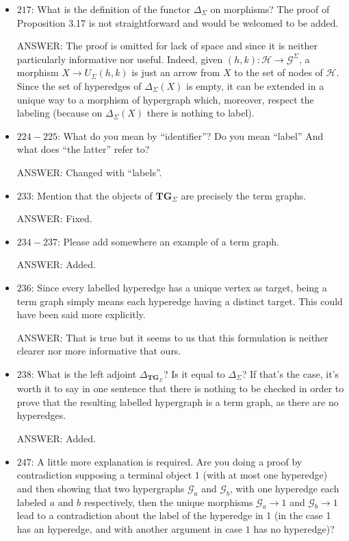 \documentclass[english,11pt,a4paper]{article}
\begin{document}
\begin{itemize}
\item $217$: What is the definition of the functor $\Delta_\Sigma$ on morphisms? The proof of Proposition 3.17 is not straightforward and would be welcomed to be added.

ANSWER: The proof is omitted for lack of space and since it is neither particularly informative nor useful. Indeed, given $(h,k)\colon \mathcal{H}\to \mathcal{G}^\Sigma$,  a morphism $X\to U_{\Sigma}(h,k)$ is just an arrow from $X$ to the set of nodes of $\mathcal{H}$. Since the set of hyperedges of $\Delta_{\Sigma}(X)$ is empty, it can be extended in a unique way to a morphism of hypergraph which, moreover, respect the labeling (because on $\Delta_{\Sigma}(X)$ there is nothing to label).

\item $224-225$: What do you mean by ``identifier''? Do you mean ``label'' And what does ``the latter'' refer to? 

ANSWER: Changed with ``labels''.

\item $233$: Mention that the objects of $\mathbf{TG}_\Sigma$ are precisely the term graphs.

ANSWER: Fixed.

\item $234-237$: Please add somewhere an example of a term graph.

ANSWER: Added.

\item $236$: Since every labelled hyperedge has a unique vertex as target, being a term graph simply means each hyperedge having a distinct target. This could have been said more explicitly.

ANSWER: That is true but it seems to us that this formulation is neither clearer nor more informative that ours.

\item $238$: What is the left adjoint $\Delta_{\mathbf{TG}_\Sigma}$? Is it equal to $\Delta_{\Sigma}$? If that's the case, it's worth it to say in one sentence that there is nothing to be checked in order to prove that the resulting labelled hypergraph is a term graph, as there are no hyperedges.

ANSWER: Added.

\item $247$: A little more explanation is required. Are you doing a proof by contradiction supposing a terminal object $1$ (with at most one hyperedge) and then showing that two hypergraphs $\mathcal{G}_a$ and $\mathcal{G}_b$, with one hyperedge each labeled $a$ and $b$ respectively, then the unique morphisms $\mathcal{G}_a \to 1$ and $\mathcal{G}_b \to 1$ lead to a contradiction about the label of the hyperedge in 1 (in the case 1 has an hyperedge, and with another argument in case $1$ has no hyperedge)? 


\end{itemize}
\end{document}
